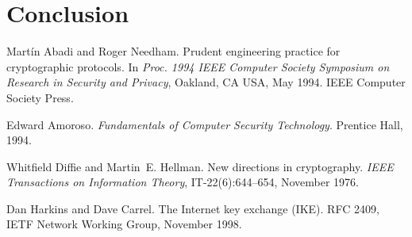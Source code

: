 \documentclass[a4paper,12pt]{article}
\begin{document}


\pagebreak[3]
\section{Conclusion}



\clearpage

\begin{thebibliography}{1}
\label{Bibliography}

Mart\'in Abadi and Roger Needham.
\newblock Prudent engineering practice for cryptographic protocols.
\newblock In \textit{Proc. 1994 IEEE Computer Society Symposium on Research 
  in Security and Privacy}, Oakland, CA USA, May 1994. IEEE Computer Society
  Press.

Edward Amoroso.
\newblock \textit{Fundamentals of Computer Security Technology}.
\newblock Prentice Hall, 1994.

Whitfield Diffie and Martin~E. Hellman.
\newblock New directions in cryptography.
\newblock \textit{IEEE Transactions on Information Theory}, IT-22(6):644--654,
  November 1976.

Dan Harkins and Dave Carrel.
\newblock The Internet key exchange (IKE).
\newblock RFC 2409, IETF Network Working Group, November 1998.

\end{thebibliography}


%
% 
%
%
\end{document}
